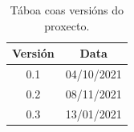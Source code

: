 \documentclass[11pt,a4paper,titlepage,twoside,openright,openbib]{report}
\begin{document}

 
 \setcounter{page}{1}

\begin{table}[h!]
\centering
\begin{tabular}{||c | c||} 
 \hline
 \textbf{Versión} & \textbf{Data}\\ [0.5ex] 
 \hline\hline
 0.1 & 04/10/2021\\
  [1ex] 
 \hline
 0.2 & 08/11/2021\\
  [1ex] 
 \hline
 0.3 & 13/01/2021\\
  [1ex] 
 \hline
\end{tabular}
\caption{Táboa coas versións do proxecto.}
\label{table:1}
\end{table}

\let\cleardoublepage=\clearpage 

 \tableofcontents

\vspace{30pt}


 
 

 \setcounter{page}{1}
 
  
 
 
  \let\cleardoublepage=\clearpage 
 
  \let\cleardoublepage=\clearpage 




%


 
 
  \let\cleardoublepage=\clearpage 
 
\end{document}
